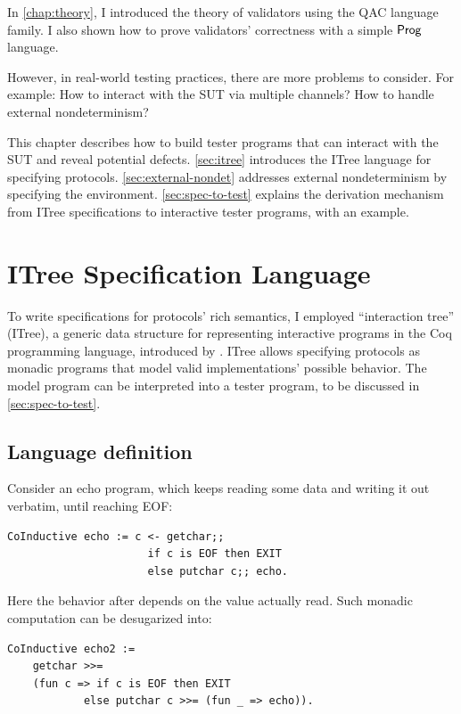In \autoref{chap:theory}, I introduced the theory of validators using the QAC
language family.  I also shown how to prove validators' correctness with a
simple $\mathsf{Prog}$ language.

However, in real-world testing practices, there are more problems to consider.
For example: How to interact with the SUT via multiple channels?  How to handle
external nondeterminism?

This chapter describes how to build tester programs that can interact with the
SUT and reveal potential defects.  \autoref{sec:itree} introduces the ITree
language for specifying protocols.  \autoref{sec:external-nondet} addresses
external nondeterminism by specifying the environment.
\autoref{sec:spec-to-test} explains the derivation mechanism from ITree
specifications to interactive tester programs, with an \http example.

\section{ITree Specification Language}
\label{sec:itree}
To write specifications for protocols' rich semantics, I employed ``interaction
tree'' (ITree), a generic data structure for representing interactive programs
in the Coq programming language, introduced by \textcite{itree}.  ITree allows
specifying protocols as monadic programs that model valid implementations'
possible behavior.  The model program can be interpreted into a tester program,
to be discussed in \autoref{sec:spec-to-test}.

\subsection{Language definition}
\label{sec:itree-lang}
Consider an echo program, which keeps reading some data and writing it out
verbatim, until reaching EOF:
\begin{lstlisting}[style=customcoq]
  CoInductive echo := c <- getchar;;
                      if c is EOF then EXIT
                      else putchar c;; echo.
\end{lstlisting}

Here the behavior after  depends on the value actually read.  Such
monadic computation can be desugarized into:
\begin{lstlisting}[style=customcoq]
  CoInductive echo2 :=
    getchar >>=
    (fun c => if c is EOF then EXIT
            else putchar c >>= (fun _ => echo)).
\end{lstlisting}

